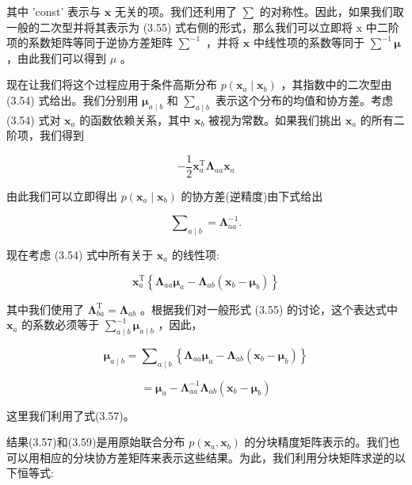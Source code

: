 \documentclass[10pt]{article}
\begin{document}
其中 'const' 表示与 \(\mathbf{x}\) 无关的项。我们还利用了 \(\sum\) 的对称性。因此，如果我们取一般的二次型并将其表示为 (3.55) 式右侧的形式，那么我们可以立即将 \(\mathrm{x}\) 中二阶项的系数矩阵等同于逆协方差矩阵 \({\mathbf{\sum }}^{-1}\) ，并将 \(\mathbf{x}\) 中线性项的系数等同于 \({\mathbf{\sum }}^{-1}\mathbf{\mu }\) ，由此我们可以得到 \(\mu\) 。

现在让我们将这个过程应用于条件高斯分布 \(p\left( {{\mathbf{x}}_{a} \mid  {\mathbf{x}}_{b}}\right)\) ，其指数中的二次型由 (3.54) 式给出。我们分别用 \({\mathbf{\mu }}_{a \mid  b}\) 和 \({\mathbf{\sum }}_{a \mid  b}\) 表示这个分布的均值和协方差。考虑 (3.54) 式对 \({\mathbf{x}}_{a}\) 的函数依赖关系，其中 \({\mathbf{x}}_{b}\) 被视为常数。如果我们挑出 \({\mathbf{x}}_{a}\) 的所有二阶项，我们得到

\[
- \frac{1}{2}{\mathbf{x}}_{a}^{\mathrm{T}}{\mathbf{\Lambda }}_{aa}{\mathbf{x}}_{a} \tag{3.56}
\]

由此我们可以立即得出 \(p\left( {{\mathbf{x}}_{a} \mid  {\mathbf{x}}_{b}}\right)\) 的协方差(逆精度)由下式给出

\[
{\mathbf{\sum }}_{a \mid  b} = {\mathbf{\Lambda }}_{aa}^{-1}. \tag{3.57}
\]

现在考虑 (3.54) 式中所有关于 \({\mathbf{x}}_{a}\) 的线性项:

\[
{\mathbf{x}}_{a}^{\mathrm{T}}\left\{  {{\mathbf{\Lambda }}_{aa}{\mathbf{\mu }}_{a} - {\mathbf{\Lambda }}_{ab}\left( {{\mathbf{x}}_{b} - {\mathbf{\mu }}_{b}}\right) }\right\}   \tag{3.58}
\]

其中我们使用了 \({\mathbf{\Lambda }}_{ba}^{\mathrm{T}} = {\mathbf{\Lambda }}_{ab}\) 。根据我们对一般形式 (3.55) 的讨论，这个表达式中 \({\mathbf{x}}_{a}\) 的系数必须等于 \({\mathbf{\sum }}_{a \mid  b}^{-1}{\mathbf{\mu }}_{a \mid  b}\) ，因此，

\[
{\mathbf{\mu }}_{a \mid  b} = {\mathbf{\sum }}_{a \mid  b}\left\{  {{\mathbf{\Lambda }}_{aa}{\mathbf{\mu }}_{a} - {\mathbf{\Lambda }}_{ab}\left( {{\mathbf{x}}_{b} - {\mathbf{\mu }}_{b}}\right) }\right\}
\]

\[
= {\mathbf{\mu }}_{a} - {\mathbf{\Lambda }}_{aa}^{-1}{\mathbf{\Lambda }}_{ab}\left( {{\mathbf{x}}_{b} - {\mathbf{\mu }}_{b}}\right)  \tag{3.59}
\]

这里我们利用了式(3.57)。

结果(3.57)和(3.59)是用原始联合分布 \(p\left( {{\mathbf{x}}_{a},{\mathbf{x}}_{b}}\right)\) 的分块精度矩阵表示的。我们也可以用相应的分块协方差矩阵来表示这些结果。为此，我们利用分块矩阵求逆的以下恒等式:
\end{document}
